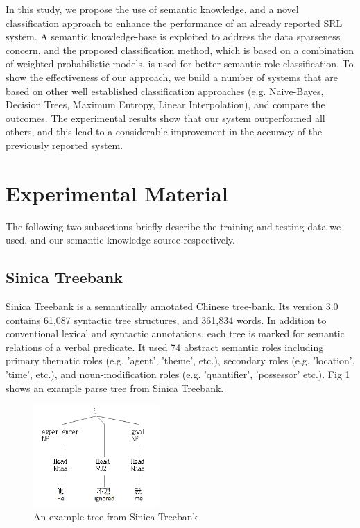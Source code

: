 \documentclass[11pt]{article}
\begin{document}
In this study, we propose the use of semantic knowledge, and a novel classification approach to enhance the performance of an already reported SRL system. A semantic knowledge-base is exploited to address the data sparseness concern, and the proposed classification method, which is based on a combination of weighted probabilistic models, is used for better semantic role classification. To show the effectiveness of our approach, we build a number of systems that are based on other well established classification approaches (e.g. Naive-Bayes, Decision Trees, Maximum Entropy, Linear Interpolation), and compare the outcomes. The experimental results show that our system outperformed all others, and this lead to a considerable improvement in the accuracy of the previously reported system.
\section{Experimental Material}
The following two subsections briefly describe the training and testing data we used, and our semantic knowledge source respectively.
\subsection{Sinica Treebank}
Sinica Treebank \cite{sinica-treebank} is a semantically annotated Chinese tree-bank. Its version 3.0 contains 61,087 syntactic tree structures, and 361,834 words. In addition to conventional lexical and syntactic annotations, each tree is marked for semantic relations of a verbal predicate. It used 74 abstract semantic roles including primary thematic roles (e.g. 'agent', 'theme', etc.), secondary roles (e.g. 'location', 'time', etc.), and noun-modification roles (e.g. 'quantifier', 'possessor' etc.). Fig 1 shows an example parse tree from Sinica Treebank.
\begin{figure}[!h]
\centering
\includegraphics[width=.4\textwidth,height=3.9cm]{./examples/example5-english-subs.png}
\caption{An example tree from Sinica Treebank}
\end{figure}
\end{document}
